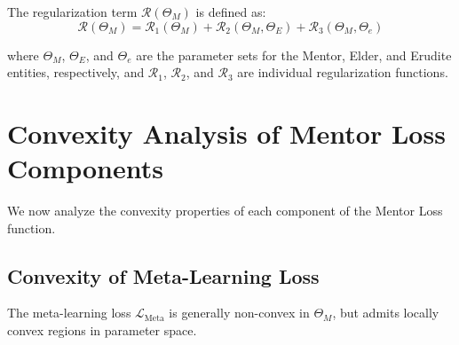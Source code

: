 \begin{definition}
The regularization term $\mathcal{R}(\Theta_M)$ is defined as:
\begin{equation}
\mathcal{R}(\Theta_M) = \mathcal{R}_1(\Theta_M) + \mathcal{R}_2(\Theta_M, \Theta_E) + \mathcal{R}_3(\Theta_M, \Theta_e)
\end{equation}

where $\Theta_M$, $\Theta_E$, and $\Theta_e$ are the parameter sets for the Mentor, Elder, and Erudite entities, respectively, and $\mathcal{R}_1$, $\mathcal{R}_2$, and $\mathcal{R}_3$ are individual regularization functions.
\end{definition}

\section{Convexity Analysis of Mentor Loss Components}

We now analyze the convexity properties of each component of the Mentor Loss function.

\subsection{Convexity of Meta-Learning Loss}

\begin{theorem}
The meta-learning loss $\mathcal{L}_{\text{Meta}}$ is generally non-convex in $\Theta_M$, but admits locally convex regions in parameter space.
\end{theorem}

